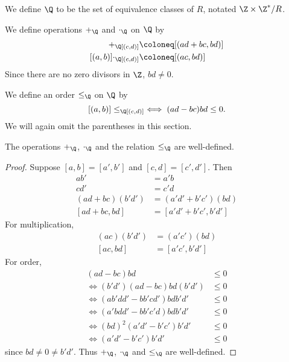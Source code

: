 \begin{definition}
    We define $\Q$ to be the set of equivalence classes of $R$, notated
    $\Z \times \Z^* / R$.
\end{definition}
We define operations $+_\Q$ and $\cdot_\Q$ on $\Q$ by
\begin{align*}
    [(a, b)] +_\Q [(c, d)] &\coloneq [(ad + bc, bd)] \\
    [(a, b)] \cdot_\Q [(c, d)] &\coloneq [(ac, bd)]
\end{align*}
Since there are no zero divisors in $\Z$, $bd \neq 0$.

We define an order $\le_\Q$ on $\Q$ by \[
    [(a, b)] \le_\Q [(c, d)] \iff (ad - bc) bd \le 0.
\]
We will again omit the parentheses in this section.
\begin{proposition} \label{thm:Q:well-defined}
    The operations $+_\Q$, $\cdot_\Q$ and the relation $\le_\Q$ are well-defined.
\end{proposition}
\begin{proof}
    Suppose $[a, b] = [a', b']$ and $[c, d] = [c', d']$.
    Then \begin{align*}
        ab' &= a'b \\
        cd' &= c'd \\
        (ad + bc)(b'd') &= (a'd' + b'c')(bd) \\
        [ad + bc, bd] &= [a'd' + b'c', b'd']
    \end{align*}
    For multiplication, \begin{align*}
        (ac)(b'd') &= (a'c')(bd) \\
        [ac, bd] &= [a'c', b'd']
    \end{align*}
    For order, \begin{align*}
        (ad - bc) bd &\le 0 \\
        \iff (b'd')(ad - bc) bd (b'd') &\le 0 \\
        \iff (ab'dd' - bb'cd') bdb'd' &\le 0 \\
        \iff (a'bdd' - bb'c'd) bdb'd' &\le 0 \\
        \iff (bd)^2 (a'd' - b'c') b'd' &\le 0 \\
        \iff (a'd' - b'c') b'd' &\le 0
    \end{align*} since $bd \ne 0 \ne b'd'$.
    Thus $+_\Q$, $\cdot_\Q$ and $\le_\Q$ are well-defined.
\end{proof}
